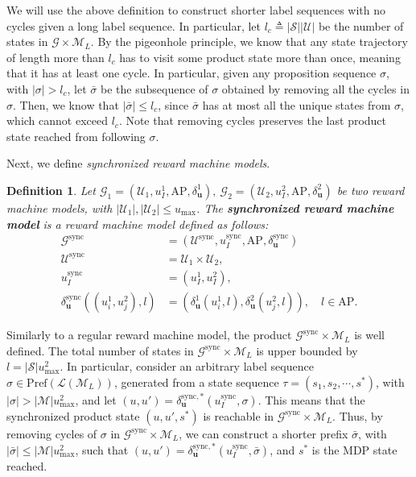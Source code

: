 \documentclass[letterpaper, 10 pt, conference]{ieeeconf}
\newcommand{\lnm}{\mathcal{L}(\mathcal{M}_L)}
\newtheorem{definition}{\textbf{Definition}}
\begin{document}
We will use the above definition to construct shorter label sequences with no cycles given a long label sequence. In particular, let $ l_c \triangleq |\mathcal{S}||\mathcal{U}|$ be the number of states in $\mathcal{G} \times \mathcal{M}_L$. By the pigeonhole principle, we know that any state trajectory of length more than $l_c$ has to visit some product state more than once, meaning that it has at least one cycle. In particular, given any proposition sequence $\sigma$, with $|\sigma| > l_c$, let $\bar \sigma$ be the subsequence of $\sigma$ obtained by removing all the cycles in $\sigma$. Then, we know that $|\bar\sigma|\leq l_c$, since $\bar \sigma$ has at most all the unique states from $\sigma$, which cannot exceed $l_c$. Note that removing cycles preserves the last product state reached from following $\sigma$.

Next, we define \emph{synchronized reward machine models}.
\begin{definition}\label{def:dsync}
    Let $\mathcal{G}_1 = (\mathcal{U}_1, u_I^1, \mathrm{AP}, \delta_{\mathbf{u}}^1),\  \mathcal{G}_2 = (\mathcal{U}_2, u_I^2, \mathrm{AP}, \delta_{\mathbf{u}}^2)$ be two reward machine models, with $|\mathcal{U}_1|,|\mathcal{U}_2|\leq u_{\mathrm{max}}$. The \textbf{synchronized reward machine model} is a reward machine model defined as follows:
    \begin{align*}
    \mathcal{G}^{\mathrm{sync}} &= (\mathcal{U}^{\mathrm{sync}}, u_I^{\mathrm{sync}}, \mathrm{AP}, \delta_{\mathbf{u}}^{\mathrm{sync}}) \\
    \mathcal{U}^{\mathrm{sync}} &= \mathcal{U}_1\times \mathcal{U}_2, \\
    u_I^{\mathrm{sync}} &= (u_I^1,u_I^2), \\
    \delta_{\mathbf{u}}^{\mathrm{sync}}((u_i^1,u_j^2), l) &= (\delta_{\mathbf{u}}^1(u_i^1,l), \delta_{\mathbf{u}}^2(u_j^2,l)), \quad l \in \mathrm{AP}. 
\end{align*}
\end{definition}

Similarly to a regular reward machine model,  the product $\mathcal{G}^{\mathrm{sync}} \times \mathcal{M}_L$ is well defined. The total number of states in $\mathcal{G}^{\mathrm{sync}} \times \mathcal{M}_L$ is upper bounded by $l = |\mathcal{S}|u_{\mathrm{max}}^2$. In particular, consider an arbitrary label sequence $\sigma \in \mathrm{Pref}(\lnm)$, generated from a state sequence $\tau = (s_1,s_2,\cdots, s^*)$, with $|\sigma| > |\mathcal{M}|u_{\mathrm{max}}^2$, and let $(u,u') = \delta_{\mathbf{u}}^{\mathrm{sync}, *}(u_I^{\mathrm{sync}}, \sigma)$. This means that the synchronized product state $(u,u',s^*)$ is reachable in $\mathcal{G}^{\mathrm{sync}} \times \mathcal{M}_L$. Thus, by removing cycles of $\sigma$ in  $\mathcal{G}^{\mathrm{sync}} \times \mathcal{M}_L$, we can construct a shorter prefix $\bar \sigma$, with $|\bar \sigma| \leq |\mathcal{M}|u_{\mathrm{max}}^2$, such that $(u,u') = \delta_{\mathbf{u}}^{\mathrm{sync}, *}(u_I^{\mathrm{sync}}, \bar \sigma)$, and $s^*$ is the MDP state reached.
\end{document}
